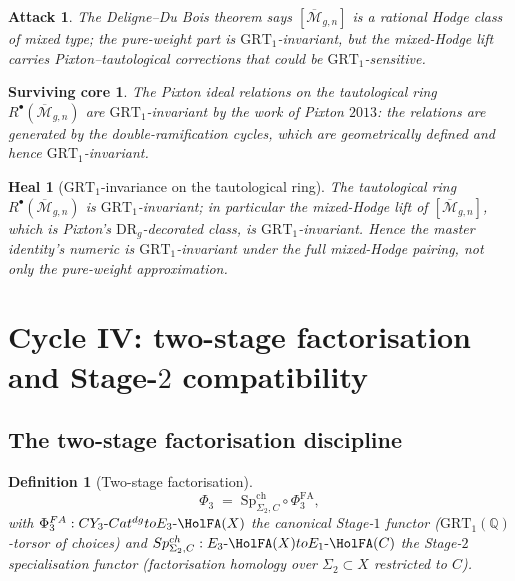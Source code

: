 \documentclass[11pt]{amsart}
\newtheorem{definition}[theorem]{Definition}
\newtheorem{attack}[theorem]{Attack}
\newtheorem{surviving}[theorem]{Surviving core}
\newtheorem{heal}[theorem]{Heal}
\providecommand{\Q}{\mathbb{Q}}
\providecommand{\GRT}{\mathrm{GRT}}
\providecommand{\PhiFA}{\Phi^{\mathrm{FA}}}
\providecommand{\SpCh}{\mathrm{Sp}^{\mathrm{ch}}}
\providecommand{\Mbar}{\overline{\mathcal{M}}}
\begin{document}
\begin{attack}
\label{att:motivic-hodge}
The Deligne--Du Bois theorem says $[\Mbar_{g, n}]$ is a rational
Hodge class of mixed type; the pure-weight part is $\GRT_1$-invariant,
but the mixed-Hodge lift carries Pixton--tautological corrections
that could be $\GRT_1$-sensitive.
\end{attack}

\begin{surviving}
\label{surv:pixton-invariance}
The Pixton ideal relations on the tautological ring $R^\bullet
(\Mbar_{g, n})$ are $\GRT_1$-invariant by the work of Pixton $2013$:
the relations are generated by the double-ramification cycles, which
are geometrically defined and hence $\GRT_1$-invariant.
\end{surviving}

\begin{heal}[$\GRT_1$-invariance on the tautological ring]
\label{heal:grt1-taut}
The tautological ring $R^\bullet(\Mbar_{g, n})$ is $\GRT_1$-invariant;
in particular the mixed-Hodge lift of $[\Mbar_{g, n}]$, which is
Pixton's $\mathrm{DR}_g$-decorated class, is $\GRT_1$-invariant.
Hence the master identity's numeric is $\GRT_1$-invariant under the
full mixed-Hodge pairing, not only the pure-weight approximation.
\end{heal}

\section{Cycle IV: two-stage factorisation and Stage-$2$ compatibility}
\label{sec:cycle-4-stage2}

\subsection{The two-stage factorisation discipline}

\begin{definition}[Two-stage factorisation]
\label{def:two-stage}
\[
 \Phi_3 \;=\; \SpCh_{\Sigma_2, C} \circ \PhiFA_3,
\]
with $\PhiFA_3 \colon \mathrm{CY}_3\text{-}\mathrm{Cat}^{\mathrm{dg}}
\to E_3\text{-}\HolFA(X)$ the canonical Stage-$1$ functor
($\GRT_1(\Q)$-torsor of choices) and $\SpCh_{\Sigma_2, C} \colon
E_3\text{-}\HolFA(X) \to E_1\text{-}\HolFA(C)$ the
Stage-$2$ specialisation functor (factorisation homology over
$\Sigma_2 \subset X$ restricted to $C$).
\end{definition}
\end{document}
